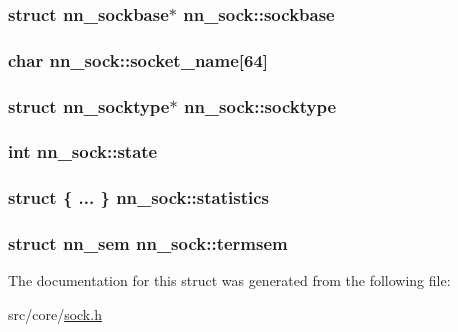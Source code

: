 \subsubsection[{sockbase}]{\setlength{\rightskip}{0pt plus 5cm}struct {\bf nn\+\_\+sockbase}$\ast$ nn\+\_\+sock\+::sockbase}\hypertarget{structnn__sock_ab1d8048bec771175fa1b0a8ed5decbdd}{}\label{structnn__sock_ab1d8048bec771175fa1b0a8ed5decbdd}
\subsubsection[{socket\+\_\+name}]{\setlength{\rightskip}{0pt plus 5cm}char nn\+\_\+sock\+::socket\+\_\+name\mbox{[}64\mbox{]}}\hypertarget{structnn__sock_aebe586094af0e703b13eb33ccd07d35c}{}\label{structnn__sock_aebe586094af0e703b13eb33ccd07d35c}
\subsubsection[{socktype}]{\setlength{\rightskip}{0pt plus 5cm}struct {\bf nn\+\_\+socktype}$\ast$ nn\+\_\+sock\+::socktype}\hypertarget{structnn__sock_a51d244f07a571239c580623b685e07de}{}\label{structnn__sock_a51d244f07a571239c580623b685e07de}
\subsubsection[{state}]{\setlength{\rightskip}{0pt plus 5cm}int nn\+\_\+sock\+::state}\hypertarget{structnn__sock_a481cb8fb955527fd926e1e1c0a199be4}{}\label{structnn__sock_a481cb8fb955527fd926e1e1c0a199be4}
\subsubsection[{statistics}]{\setlength{\rightskip}{0pt plus 5cm}struct \{ ... \}   nn\+\_\+sock\+::statistics}\hypertarget{structnn__sock_a1ec3bb9a8e7c01aae8b396c4d17407e8}{}\label{structnn__sock_a1ec3bb9a8e7c01aae8b396c4d17407e8}
\subsubsection[{termsem}]{\setlength{\rightskip}{0pt plus 5cm}struct nn\+\_\+sem nn\+\_\+sock\+::termsem}\hypertarget{structnn__sock_a899d6cc7b10998e4e4979558dabd5c0d}{}\label{structnn__sock_a899d6cc7b10998e4e4979558dabd5c0d}


The documentation for this struct was generated from the following file\+:\begin{DoxyCompactItemize}
\item 
src/core/\hyperlink{sock_8h}{sock.\+h}\end{DoxyCompactItemize}
